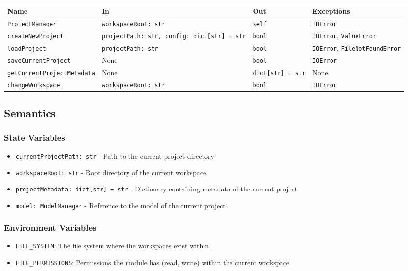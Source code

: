 \documentclass[12pt, titlepage]{article}
\begin{document}
\begin{center}
\renewcommand{\arraystretch}{1.55}
\begin{tabular}{p{5.2cm} p{5cm} p{3cm} p{3cm}}
\toprule
\textbf{Name} & \textbf{In} & \textbf{Out} & \textbf{Exceptions} \\
\midrule
\texttt{ProjectManager} & \texttt{workspaceRoot: str} & \texttt{self} & \texttt{IOError} \\
\texttt{createNewProject} & \texttt{projectPath: str, \newline config: dict[str] = str} & \texttt{bool} & \texttt{IOError}, \newline \texttt{ValueError} \\
\texttt{loadProject} & \texttt{projectPath: str} & \texttt{bool} & \texttt{IOError}, \newline \texttt{FileNotFoundError} \\
\texttt{saveCurrentProject} & None & \texttt{bool} & \texttt{IOError} \\
\texttt{getCurrentProjectMetadata} & None & \texttt{dict[str] = str} & None \\
\texttt{changeWorkspace} & \texttt{workspaceRoot: str} & \texttt{bool} & \texttt{IOError} \\
\bottomrule
\end{tabular}
\end{center}

\subsection{Semantics}

\subsubsection{State Variables}
\begin{itemize}
  \item \texttt{currentProjectPath: str} - Path to the current project directory
  \item \texttt{workspaceRoot: str} - Root directory of the current workspace
  \item \texttt{projectMetadata: dict[str] = str} - Dictionary containing metadata of the current project
  \item \texttt{model: ModelManager} - Reference to the model of the current project
\end{itemize}

\subsubsection{Environment Variables}
\begin{itemize}
  \item \texttt{FILE\_SYSTEM}: The file system where the workspaces exist within
  \item \texttt{FILE\_PERMISSIONS}: Permissions the module has (read, write) within the current workspace
\end{itemize}
\end{document}
